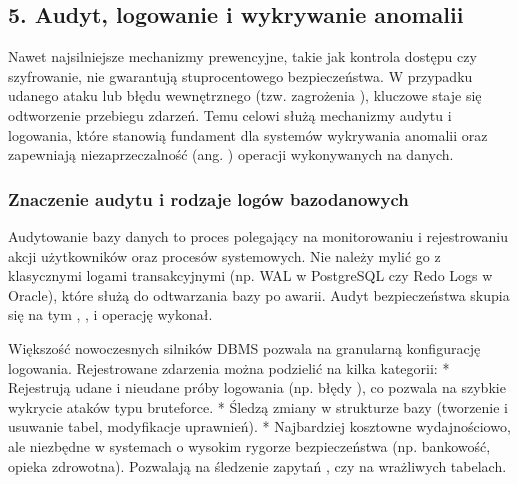 \documentclass[a4paper,11pt,english,openany,oneside]{sphinxmanual}
\begin{document}
\subsection{5. Audyt, logowanie i wykrywanie anomalii}
\label{\detokenize{rozdzial_2/rozdzial_27/rozdzial_5:audyt-logowanie-i-wykrywanie-anomalii}}\label{\detokenize{rozdzial_2/rozdzial_27/rozdzial_5::doc}}
\sphinxAtStartPar
Nawet najsilniejsze mechanizmy prewencyjne, takie jak kontrola dostępu czy szyfrowanie, nie gwarantują stuprocentowego bezpieczeństwa. W przypadku udanego ataku lub błędu wewnętrznego (tzw. zagrożenia ), kluczowe staje się odtworzenie przebiegu zdarzeń. Temu celowi służą mechanizmy audytu i logowania, które stanowią fundament dla systemów wykrywania anomalii oraz zapewniają niezaprzeczalność (ang. ) operacji wykonywanych na danych.


\subsubsection{Znaczenie audytu i rodzaje logów bazodanowych}
\label{\detokenize{rozdzial_2/rozdzial_27/rozdzial_5:znaczenie-audytu-i-rodzaje-logow-bazodanowych}}
\sphinxAtStartPar
Audytowanie bazy danych to proces polegający na monitorowaniu i rejestrowaniu akcji użytkowników oraz procesów systemowych. Nie należy mylić go z klasycznymi logami transakcyjnymi (np. WAL w PostgreSQL czy Redo Logs w Oracle), które służą do odtwarzania bazy po awarii. Audyt bezpieczeństwa skupia się na tym , ,  i  operację wykonał.

\sphinxAtStartPar
Większość nowoczesnych silników DBMS pozwala na granularną konfigurację logowania. Rejestrowane zdarzenia można podzielić na kilka kategorii:
*  Rejestrują udane i nieudane próby logowania (np. błędy ), co pozwala na szybkie wykrycie ataków typu brute\sphinxhyphen{}force.
*  Śledzą zmiany w strukturze bazy (tworzenie i usuwanie tabel, modyfikacje uprawnień).
*  Najbardziej kosztowne wydajnościowo, ale niezbędne w systemach o wysokim rygorze bezpieczeństwa (np. bankowość, opieka zdrowotna). Pozwalają na śledzenie zapytań ,  czy  na wrażliwych tabelach.
\end{document}
